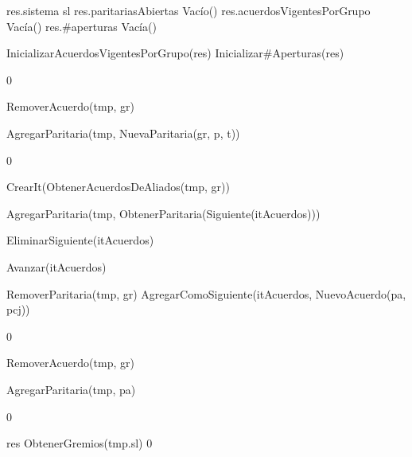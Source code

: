 {
	\state res.sistema \asig sl								
	\state res.paritariasAbiertas \asig Vacío()				
	\state res.acuerdosVigentesPorGrupo \asig Vacía()		
	\state res.\#aperturas \asig Vacía()					
	\state

	\state InicializarAcuerdosVigentesPorGrupo(res)			
	\state Inicializar\#Aperturas(res)						
}
{0}
{\addtocounter{lipsumcounter}{1}}

{
						
		\state RemoverAcuerdo(tmp, gr)							
	\endif
	\state

	\state AgregarParitaria(tmp, NuevaParitaria(gr, p, t))		
}
{0}
{\addtocounter{lipsumcounter}{1}}

{

	\state {} \asig CrearIt(ObtenerAcuerdosDeAliados(tmp, gr))		
			
		\state

		\state AgregarParitaria(tmp, ObtenerParitaria(Siguiente(itAcuerdos)))		

		\state EliminarSiguiente(itAcuerdos)										

		\state
		\state Avanzar(itAcuerdos)													
	\endwhile
	\state

	\state {} \asig RemoverParitaria(tmp, gr)				
	\state AgregarComoSiguiente(itAcuerdos, NuevoAcuerdo(pa, pcj))			
}
{0}
{\addtocounter{lipsumcounter}{1}}

{
	\state {} \asig RemoverAcuerdo(tmp, gr)			

	\state AgregarParitaria(tmp, pa)									
}
{0}
{\addtocounter{lipsumcounter}{1}}

{
	\state res \asig ObtenerGremios(tmp.sl)
}
{0}
{\addtocounter{lipsumcounter}{1}}

